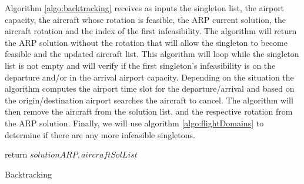 
Algorithm \ref{algo:backtracking} receives as inputs the singleton list, the airport capacity, the aircraft whose rotation is feasible, the ARP current solution, the aircraft rotation and the index of the first infeasibility. The algorithm will return the ARP solution without the rotation that will allow the singleton to become feasible and the updated aircraft list. This algorithm will loop while the singleton list is not empty and will verify if the first singleton's infeasibility is on the departure and/or in the arrival airport capacity. Depending on the situation the algorithm computes the airport time slot for the departure/arrival and based on the origin/destination airport searches the  aircraft to cancel. The algorithm will then remove the aircraft from the solution list, and the respective rotation from the ARP solution. Finally, we will use algorithm \ref{algo:flightDomains} to determine if there are any more infeasible singletons.
\begin{algorithm}[H]
	\DontPrintSemicolon
	\While{$ singletonList \ne \{\}$}{
		
		\If{$singletonList(0) = 'dep'$}{
			$startInt \gets 60 * int(singleton^d(0)/60)$\\
			$endInt \gets startInt + 60$\\
			$origin \gets singleton^o(0)$\\
			$flight2Cancel \gets solutionARP[(origin, startInt, endInt)]$\\
			$airc2Cancel \gets updateMulti(flight2Cancel, \mathcal{A}, solutionARP])$\\
			$aircraftSolList \gets aircraftSolList - airc2Cancel$\\
			$solutionARP.pop(airc2Cancel)$\\
			$flightRanges, singletonList, totalCombos \gets domainFlights(\rho_p(i) \forall i \in [index, |\rho_p|], \mathcal{A}, index)$\\
		}
		\If{$singleton(0) = 'arr'$}{
			$startInt \gets 60 * int(singleton^a(0)/60)$\\
			$endInt \gets startInt + 60$\\
			$destination \gets singleton^f(0)$\\
			$flight2Cancel \gets solutionARP[(destination, startInt, endInt)]$\\
			$airc2Cancel \gets updateMulti(flight2Cancel, \mathcal{A}, solutionARP)$\\
			$aircraftSolList \gets aircraftSolList - airc2Cancel$\\
			$solutionARP.pop(airc2Cancel)$\\
			$flightRanges, singletonList, totalCombos \gets domainFlights(\rho_p(i) \forall i \in [index, |\rho_p|], \mathcal{A}, index)$\\
		}

	}
	return $solutionARP, aircraftSolList$
	\caption{Backtracking}
	\label{algo:backtracking}
\end{algorithm}

